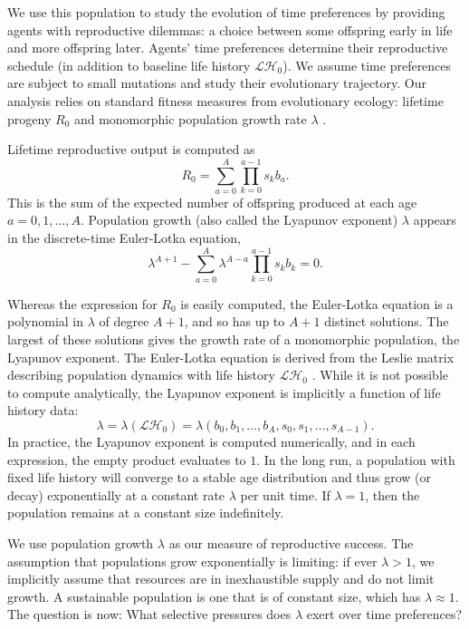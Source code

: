 \documentclass[titlepage, hidelinks, 12pt]{article}
\theoremstyle{plain}
\theoremstyle{remark}
\theoremstyle{definition}
\newcommand{\LH}{\mathcal{LH}}
\begin{document}
We use this population to study the evolution of time preferences by providing agents with reproductive dilemmas: a choice
between some offspring early in life and more offspring later. Agents' time preferences determine their reproductive schedule
(in addition to baseline life history $\LH_0$). We assume 
time preferences are subject to small mutations and study their evolutionary trajectory. Our analysis relies on 
standard fitness measures from evolutionary ecology: lifetime progeny $R_0$ and monomorphic population growth rate $\lambda$ 
\cite{stearns92}.
 

Lifetime reproductive output is computed as
\begin{equation}
    R_0 = \sum\limits_{a = 0}^A \prod\limits_{k = 0}^{a-1} s_k b_a.
    \label{eqn:output}
\end{equation}
This is the sum of the expected number of offspring produced at each age $a= 0, 1, \ldots, A$. 
Population growth (also called the Lyapunov exponent) $\lambda$
appears in the discrete-time Euler-Lotka equation,
\begin{equation}
    \lambda^{A+1} - \sum\limits_{a = 0}^A \lambda^{A-a} \prod\limits_{k = 0}^{a-1}s_k b_k= 0.
    \label{eqn:euler-lotka}
\end{equation}


Whereas the expression for $R_0$ is easily computed, the Euler-Lotka equation
is a polynomial in $\lambda$ of degree $A+1$, and so has up to $A+1$ distinct solutions. The largest of these solutions gives the growth
rate of a monomorphic population, the Lyapunov exponent.
The Euler-Lotka equation is derived from the Leslie matrix describing population dynamics with life history $\LH_0$ \cite{stearns92}.
While it is not possible to compute analytically, the Lyapunov exponent is implicitly a function of life history data:
\begin{equation}
    \lambda = \lambda(\LH_0) = \lambda(b_0, b_1, \ldots, b_{A}, s_0, s_1, \ldots, s_{A-1}).
    \label{eqn:lambda_function}
\end{equation}
In practice, the Lyapunov exponent is computed numerically, and in each expression, the empty product evaluates to $1$. 
In the long run, a population with fixed life history will converge to a stable age distribution and
thus grow (or decay) 
exponentially at a constant rate $\lambda$ per unit time. If $\lambda = 1$, then the population remains at a constant size indefinitely.

We use population growth $\lambda$ as our measure of reproductive success. The assumption that populations grow exponentially is limiting: if
ever $\lambda > 1$,  we implicitly assume that resources are in inexhaustible supply 
and do not limit growth. A sustainable population is one that is of constant size, which has
$\lambda \approx 1$. The question is now: What selective pressures does $\lambda$ 
exert over time preferences?
\end{document}
